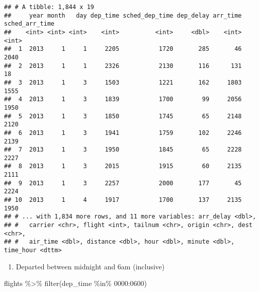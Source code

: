 \documentclass[
]{article}
\newenvironment{Shaded}{\begin{snugshade}}{\end{snugshade}}
\newcommand{\DecValTok}[1]{\textcolor[rgb]{0.00,0.00,0.81}{#1}}
\newcommand{\FunctionTok}[1]{\textcolor[rgb]{0.00,0.00,0.00}{#1}}
\newcommand{\NormalTok}[1]{#1}
\newcommand{\SpecialCharTok}[1]{\textcolor[rgb]{0.00,0.00,0.00}{#1}}
\providecommand{\tightlist}{%
  \setlength{\itemsep}{0pt}\setlength{\parskip}{0pt}}
\begin{document}
\begin{verbatim}
## # A tibble: 1,844 x 19
##     year month   day dep_time sched_dep_time dep_delay arr_time sched_arr_time
##    <int> <int> <int>    <int>          <int>     <dbl>    <int>          <int>
##  1  2013     1     1     2205           1720       285       46           2040
##  2  2013     1     1     2326           2130       116      131             18
##  3  2013     1     3     1503           1221       162     1803           1555
##  4  2013     1     3     1839           1700        99     2056           1950
##  5  2013     1     3     1850           1745        65     2148           2120
##  6  2013     1     3     1941           1759       102     2246           2139
##  7  2013     1     3     1950           1845        65     2228           2227
##  8  2013     1     3     2015           1915        60     2135           2111
##  9  2013     1     3     2257           2000       177       45           2224
## 10  2013     1     4     1917           1700       137     2135           1950
## # ... with 1,834 more rows, and 11 more variables: arr_delay <dbl>,
## #   carrier <chr>, flight <int>, tailnum <chr>, origin <chr>, dest <chr>,
## #   air_time <dbl>, distance <dbl>, hour <dbl>, minute <dbl>, time_hour <dttm>
\end{verbatim}

\begin{enumerate}
\def\labelenumi{\arabic{enumi}.}
\setcounter{enumi}{6}
\tightlist
\item
  Departed between midnight and 6am (inclusive)
\end{enumerate}

\begin{Shaded}
\begin{Highlighting}[]
\NormalTok{flights }\SpecialCharTok{\%\textgreater{}\%} \FunctionTok{filter}\NormalTok{(dep\_time }\SpecialCharTok{\%in\%} \DecValTok{0000}\SpecialCharTok{:}\DecValTok{0600}\NormalTok{)}
\end{Highlighting}
\end{Shaded}
\end{document}
